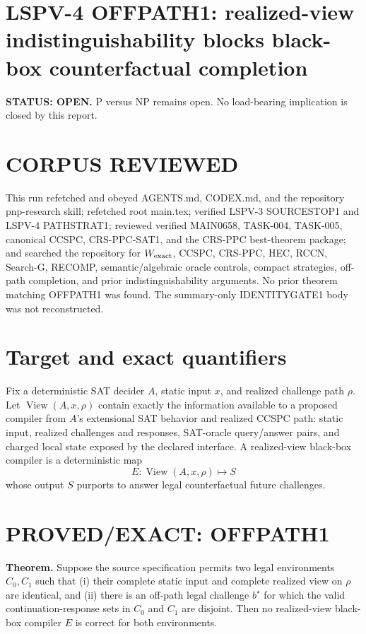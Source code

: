 \documentclass[11pt]{article}
\begin{document}
\section*{LSPV-4 OFFPATH1: realized-view indistinguishability blocks black-box counterfactual completion}
\textbf{STATUS: OPEN.} P versus NP remains open. No load-bearing implication is closed by this report.

\section*{CORPUS REVIEWED}
This run refetched and obeyed AGENTS.md, CODEX.md, and the repository pnp-research skill; refetched root main.tex; verified LSPV-3 SOURCESTOP1 and LSPV-4 PATHSTRAT1; reviewed verified MAIN0658, TASK-004, TASK-005, canonical CCSPC, CRS-PPC-SAT1, and the CRS-PPC best-theorem package; and searched the repository for \(W_{\rm exact}\), CCSPC, CRS-PPC, HEC, RCCN, Search-G, RECOMP, semantic/algebraic oracle controls, compact strategies, off-path completion, and prior indistinguishability arguments. No prior theorem matching OFFPATH1 was found. The summary-only IDENTITYGATE1 body was not reconstructed.

\section*{Target and exact quantifiers}
Fix a deterministic SAT decider \(A\), static input \(x\), and realized challenge path \(\rho\). Let \(\operatorname{View}(A,x,\rho)\) contain exactly the information available to a proposed compiler from \(A\)'s extensional SAT behavior and realized CCSPC path: static input, realized challenges and responses, SAT-oracle query/answer pairs, and charged local state exposed by the declared interface. A realized-view black-box compiler is a deterministic map
\[
E:\operatorname{View}(A,x,\rho)\mapsto S
\]
whose output \(S\) purports to answer legal counterfactual future challenges.

\section*{PROVED/EXACT: OFFPATH1}
\textbf{Theorem.} Suppose the source specification permits two legal environments \(C_0,C_1\) such that (i) their complete static input and complete realized view on \(\rho\) are identical, and (ii) there is an off-path legal challenge \(b^\star\) for which the valid continuation-response sets in \(C_0\) and \(C_1\) are disjoint. Then no realized-view black-box compiler \(E\) is correct for both environments.
\end{document}
